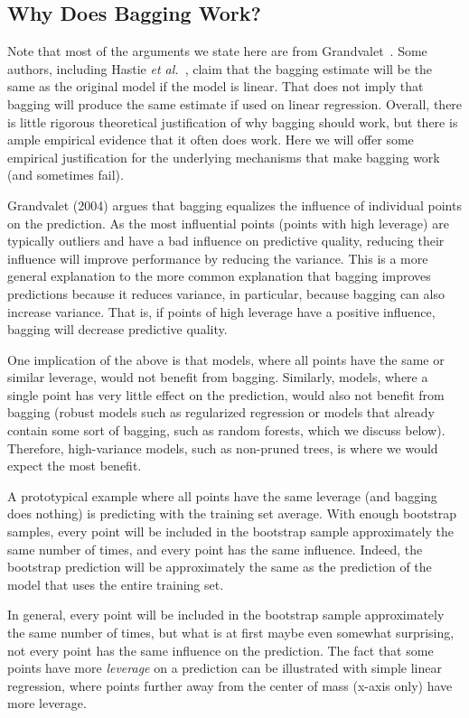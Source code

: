 \begin{refsection}
\subsection*{Why Does Bagging Work?}

Note that most of the arguments we state here are from Grandvalet~\cite{Grandvalet2004}. Some authors, including Hastie {\em et al.}~\cite{2016-Hastie}, claim that the bagging estimate will be the same as the original model if the model is linear. That does not imply that bagging will produce the same estimate if used on linear regression. Overall, there is little rigorous theoretical justification of why bagging should work, but there is ample empirical evidence that it often does work. Here we will offer some empirical justification for the underlying mechanisms that make bagging work (and sometimes fail).

Grandvalet (2004) argues that bagging equalizes the influence of individual points on the prediction. As the most influential points (points with high leverage) are typically outliers and have a bad influence on predictive quality, reducing their influence will improve performance by reducing the variance. This is a more general explanation to the more common explanation that bagging improves predictions because it reduces variance, in particular, because bagging can also increase variance. That is, if points of high leverage have a positive influence, bagging will decrease predictive quality.

One implication of the above is that models, where all points have the same or similar leverage, would not benefit from bagging. Similarly, models, where a single point has very little effect on the prediction, would also not benefit from bagging (robust models such as regularized regression or models that already contain some sort of bagging, such as random forests, which we discuss below). Therefore, high-variance models, such as non-pruned trees, is where we would expect the most benefit.

A prototypical example where all points have the same leverage (and bagging does nothing) is predicting with the training set average. With enough bootstrap samples, every point will be included in the bootstrap sample approximately the same number of times, and every point has the same influence. Indeed, the bootstrap prediction will be approximately the same as the prediction of the model that uses the entire training set.

In general, every point will be included in the bootstrap sample approximately the same number of times, but what is at first maybe even somewhat surprising, not every point has the same influence on the prediction. The fact that some points have more {\em leverage} on a prediction can be illustrated with simple linear regression, where points further away from the center of mass (x-axis only) have more leverage.


\end{refsection}
